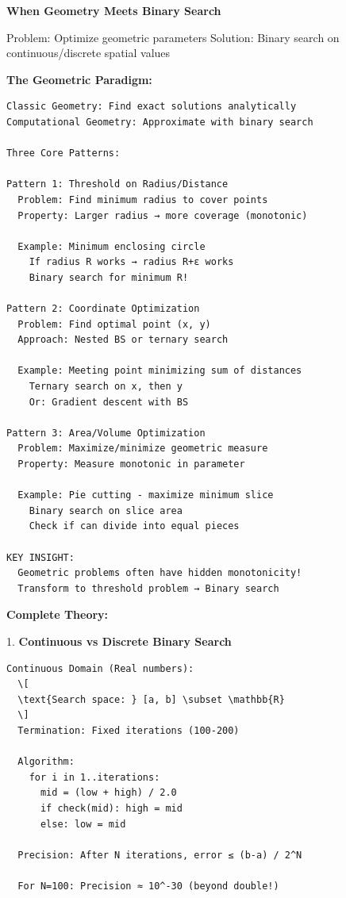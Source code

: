 \documentclass[11pt,a4paper,oneside]{book}
\begin{document}
\begin{tcolorbox}[
    enhanced,breakable,
    colback=white,
    colframe=deepblue,
    boxrule=1.5pt,
    arc=3mm,
    title=\textbf{Spatial Monotonicity and Continuous Optimization}
]
\textbf{When Geometry Meets Binary Search}

Problem: Optimize geometric parameters
Solution: Binary search on continuous/discrete spatial values

\textbf{The Geometric Paradigm:}
\begin{verbatim}
Classic Geometry: Find exact solutions analytically
Computational Geometry: Approximate with binary search

Three Core Patterns:

Pattern 1: Threshold on Radius/Distance
  Problem: Find minimum radius to cover points
  Property: Larger radius → more coverage (monotonic)
  
  Example: Minimum enclosing circle
    If radius R works → radius R+ε works
    Binary search for minimum R!

Pattern 2: Coordinate Optimization
  Problem: Find optimal point (x, y)
  Approach: Nested BS or ternary search
  
  Example: Meeting point minimizing sum of distances
    Ternary search on x, then y
    Or: Gradient descent with BS

Pattern 3: Area/Volume Optimization
  Problem: Maximize/minimize geometric measure
  Property: Measure monotonic in parameter
  
  Example: Pie cutting - maximize minimum slice
    Binary search on slice area
    Check if can divide into equal pieces

KEY INSIGHT:
  Geometric problems often have hidden monotonicity!
  Transform to threshold problem → Binary search
\end{verbatim}

\textbf{Complete Theory:}

1. \textbf{Continuous vs Discrete Binary Search}
\begin{verbatim}
Continuous Domain (Real numbers):
  \[
  \text{Search space: } [a, b] \subset \mathbb{R}
  \]
  Termination: Fixed iterations (100-200)
  
  Algorithm:
    for i in 1..iterations:
      mid = (low + high) / 2.0
      if check(mid): high = mid
      else: low = mid
  
  Precision: After N iterations, error ≤ (b-a) / 2^N
  
  For N=100: Precision ≈ 10^-30 (beyond double!)


\end{verbatim}
\end{tcolorbox}
\end{document}
